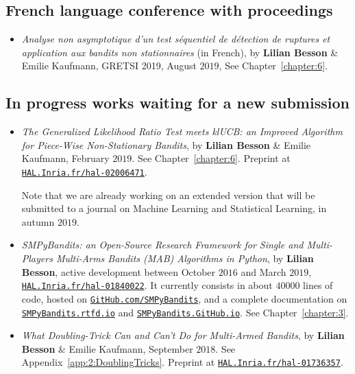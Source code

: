 \subsection*{French language conference with proceedings}

\begin{itemize}
\item
    \emph{Analyse non asymptotique d'un test séquentiel de détection de ruptures et application aux bandits non stationnaires} (in French),
    by \textbf{Lilian Besson} \& Emilie Kaufmann,
    GRETSI 2019,
    August $2019$,
    See Chapter~\ref{chapter:6}.
    \cite{Besson2019Gretsi}

\end{itemize}


\subsection*{In progress works waiting for a new submission}

\begin{itemize}

\item
    \emph{The Generalized Likelihood Ratio Test meets klUCB: an Improved Algorithm for Piece-Wise Non-Stationary Bandits},
    by \textbf{Lilian Besson} \& Emilie Kaufmann,
    February $2019$.
    See Chapter~\ref{chapter:6}.
    Preprint at \href{https://HAL.Inria.fr/hal-02006471}{\texttt{HAL.Inria.fr/hal-02006471}}.
    \cite{Besson2019GLRT}

    Note that we are already working on an extended version that will be submitted to a journal on Machine Learning and Statistical Learning, in autumn $2019$.

\item
    \emph{SMPyBandits: an Open-Source Research Framework for Single and Multi-Players Multi-Arms Bandits (MAB) Algorithms in Python},
    by \textbf{Lilian Besson}, active development between October $2016$ and March $2019$,
    \href{https://HAL.Inria.fr/hal-01840022}{\texttt{HAL.Inria.fr/hal-01840022}}.
    It currently consists in about $40000$ lines of code, hosted on \href{https://GitHub.com/SMPyBandits}{\texttt{GitHub.com/SMPyBandits}},
    and a complete documentation on \href{https://SMPyBandits.rtfd.io}{\texttt{SMPyBandits.rtfd.io}} and \href{https://SMPyBandits.GitHub.io}{\texttt{SMPyBandits.GitHub.io}}.
    See Chapter~\ref{chapter:3}.
    \cite{SMPyBandits,SMPyBanditsJMLR}

\item
    \emph{What Doubling-Trick Can and Can't Do for Multi-Armed Bandits},
    by \textbf{Lilian Besson} \& Emilie Kaufmann,
    September $2018$.
    See Appendix~\ref{app:2:DoublingTricks}.
    Preprint at \href{https://HAL.Inria.fr/hal-01736357}{\texttt{HAL.Inria.fr/hal-01736357}}.
    \cite{Besson2018DoublingTricks}

\end{itemize}


